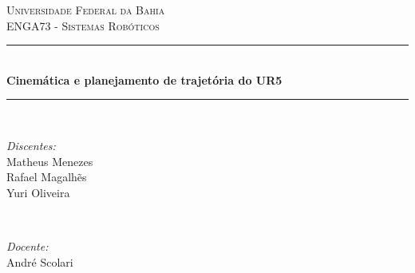 \begin{titlepage}

\newcommand{\HRule}{\rule{\linewidth}{0.5mm}} %

\center %
 

\textsc{\LARGE Universidade Federal da Bahia}\\[1.5cm] 
\textsc{\Large ENGA73 - Sistemas Robóticos}\\[0.5cm] 


\HRule \\[0.4cm]
{ \huge \bfseries Cinemática e planejamento de trajetória do UR5}\\[0.4cm] %
\HRule \\[1.5cm]
 

\begin{minipage}{0.4\textwidth}
\begin{flushleft} \large
\emph{Discentes:} \\
{\normalsize
\hspace{1em} Matheus Menezes \\
\hspace{1em} Rafael Magalhẽs \\
\hspace{1em} Yuri Oliveira}
\end{flushleft}
\end{minipage}
~
\begin{minipage}{0.4\textwidth}
\begin{flushright} \large
\emph{Docente:} \\
André Scolari
\end{flushright}
\end{minipage}\\[2cm]


\end{titlepage}
